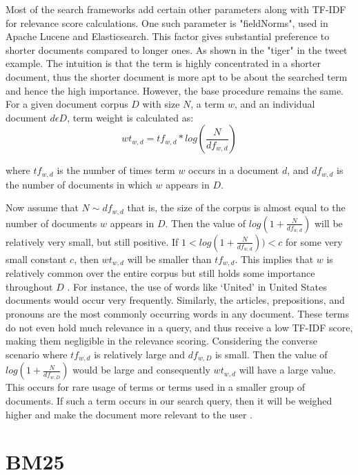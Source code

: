 Most of the search frameworks add certain other parameters along with TF-IDF for relevance score calculations. One such parameter is "fieldNorms", used in Apache Lucene and Elasticsearch. This factor gives substantial preference to shorter documents compared to longer ones. As shown in the "tiger" in the tweet example. The intuition is that the term is highly concentrated in a shorter document, thus the shorter document is more apt to be about the searched term and hence the high importance. However, the base procedure remains the same. For a given document corpus $D$ with size $N$, a term $w$, and an individual document $d \epsilon D$, term weight is calculated as:
\begin{equation} \label{eq:2.1}
        wt_{w,d} = tf_{w,d}*log(\frac{N}{df_{w,d}})   
\end{equation}  

where $tf_{w,d}$ is the number of times term $w$ occurs in a document $d$, and  $df_{w,d}$ is the number of documents in which $w$ appears in $D$.

Now assume that $N \mathtt{\sim} df_{w,d}$ that is, the size of the corpus is almost equal to the number of documents $w$ appears in $D$. Then the value of $log(1+\frac{N}{df_{w,d}})$ will be relatively very small, but still positive. 
If  $ 1 < log(1+\frac{N}{df_{w,d}})) < c $ for some very small constant $c$, then $wt_{w,d}$ will be smaller than  $tf_{w,d}$. This implies that $w$ is relatively common over the entire corpus but still holds some importance throughout $D$ \cite{RN15}.  For instance, the use of words like ‘United’ in United States documents would occur very frequently. Similarly, the articles, prepositions, and pronouns are the most commonly occurring words in any document. These terms do not even hold much relevance in a query, and thus receive a low TF-IDF score, making them negligible in the relevance scoring. 
Considering the converse scenario where $tf_{w,d}$ is relatively large and  $df_{w,D}$ is small. Then the value of $log(1+\frac{N}{df_{w,D}})$  would be large and consequently $wt_{w,d}$ will have a large value. This occurs for rare usage of terms or terms used in a smaller group of documents. If such a term occurs in our search query, then it will be weighed higher and make the document more relevant to the user \cite{RN15}.  

\section{BM25}

